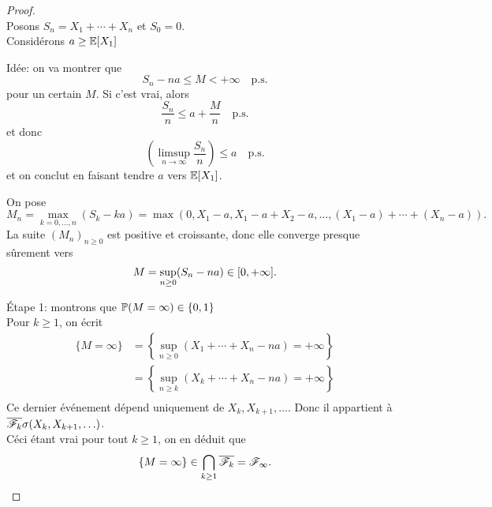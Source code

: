 \begin{proof}\,\\
    \ptr{} Posons \(S_n = X_1 + \cdots + X_n\) et \(S_0 = 0\).\\
    Considérons \(a\geq \mathbb{E}\mathopen{}\left[X_1\right]\mathclose{}\)

    \ptr{} Idée: on va montrer que
    \begin{equation*}
        S_n - na \leq M < +\infty \quad\text{p.s.}
    \end{equation*}
    pour un certain \(M\). Si c'est vrai, alors
    \begin{equation*}
        \frac{S_n}{n}\leq a + \frac{M}{n} \quad\text{p.s.}
    \end{equation*}
    et donc
    \begin{equation*}
        \left(\limsup_{n\to\infty} \frac{S_n}{n}\right) \leq a \quad\text{p.s.}
    \end{equation*}
    et on conclut en faisant tendre \(a\) vers \(\mathbb{E}\mathopen{}\left[X_1\right]\mathclose{}\).

    \ptr{} On pose
    \begin{equation*}
        M_n = \max\limits_{k=0, \ldots, n} (S_k - ka) = \max(0,X_1-a, X_1 - a + X_2 - a, \ldots, (X_1 - a) + \cdots + (X_n - a)).
    \end{equation*}
    La suite \({(M_n)}_{n\geq 0}\) est positive et croissante,
    donc elle converge presque sûrement vers
    \begin{equation*}
        M = \sup_{n\geq 0} (S_n - na)\in \mathopen{}\left[0, +\infty\right]\mathclose{}.
    \end{equation*}

    \ptr{} \'Etape 1: montrons que \(\mathbb{P}(M=\infty) \in\{0,1\}\)\\
    Pour \(k\geq 1\), on écrit
    \begin{equation*}
        \begin{aligned}
            \{M=\infty\} 
            &= \left\{\sup_{n\geq 0} (X_1 + \cdots + X_n - na) = +\infty\right\}\\
            &= \left\{\sup_{n\geq k} (X_k + \cdots + X_n - na) = +\infty\right\}\\
        \end{aligned}
    \end{equation*}
    Ce dernier événement dépend uniquement de \(X_k, X_{k+1}, \ldots\).
    Donc il appartient à \(\overline{\mathscr{F}_k}\sigma(X_k, X_{k+1}, \ldots)\).\\
    Céci étant vrai pour tout \(k\geq 1\), on en déduit que
    \begin{equation*}
        \{M=\infty\} \in \bigcap_{k\geq 1} \overline{\mathscr{F}_k} = \mathscr{F}_\infty.
    \end{equation*}


\end{proof}
